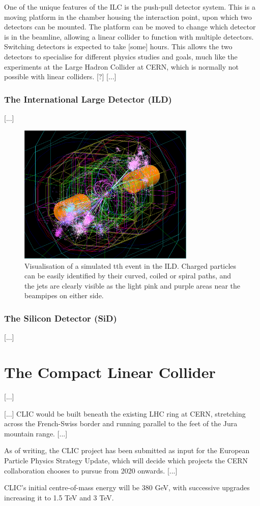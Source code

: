 One of the unique features of the ILC is the push-pull detector system. This is a moving platform in the chamber housing the interaction point, upon which two detectors can be mounted. The platform can be moved to change which detector is in the beamline, allowing a linear collider to function with multiple detectors. Switching detectors is expected to take [some] hours. This allows the two detectors to specialise for different physics studies and goals, much like the experiments at the Large Hadron Collider at CERN, which is normally not possible with linear colliders. [?] [...]

\subsubsection{The International Large Detector (ILD)}
[...]

\begin{figure}[h]
	\centering
	\includegraphics[width=0.75\textwidth]{../Pictures/SimulatedEvent1.png}
	\caption{Visualisation of a simulated tth event in the ILD. Charged particles can be easily identified by their curved, coiled or spiral paths, and the jets are clearly visible as the light pink and purple areas near the beampipes on either side.}
	\label{figure:colliders/ILD/tth-simulation}
\end{figure}

\subsubsection{The Silicon Detector (SiD)}
[...]

\section{The Compact Linear Collider}
[...]

[...] CLIC would be built beneath the existing LHC ring at CERN, stretching across the French-Swiss border and running parallel to the feet of the Jura mountain range. [...]

As of writing, the CLIC project has been submitted as input for the European Particle Physics Strategy Update, which will decide which projects the CERN collaboration chooses to pursue from 2020  onwards. [...]

CLIC's initial centre-of-mass energy will be 380 GeV, with successive upgrades increasing it to 1.5 TeV and 3 TeV. 